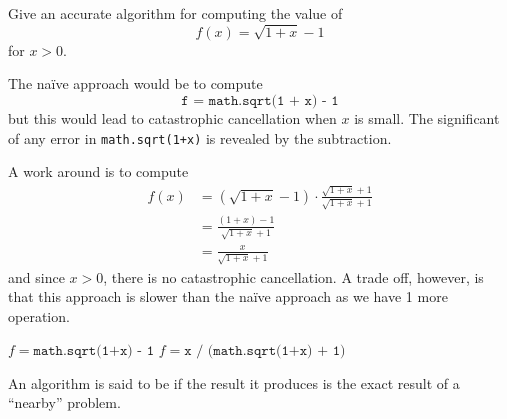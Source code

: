 \begin{example}
    Give an accurate algorithm for computing the value of \[
        f(x) = \sqrt{1 + x} - 1
    \] for \( x > 0 \).

    The na\"ive approach would be to compute \[
        \texttt{f = math.sqrt(1 + x) - 1}
    \] but this would lead to catastrophic cancellation when \( x \) is small. The significant of any error in \texttt{math.sqrt(1+x)} is revealed by the subtraction.

    A work around is to compute \begin{align*}
        f(x)
         & = (\sqrt{1+x} - 1) \cdot \frac{\sqrt{1+x}+1}{\sqrt{1+x}+1} \\
         & = \frac{(1+x) - 1}{\sqrt{1+x} + 1}                         \\
         & = \frac{x}{\sqrt{1+x} + 1}
    \end{align*} and since \( x > 0 \), there is no catastrophic cancellation. A trade off, however, is that this approach is slower than the na\"ive approach as we have 1 more operation.

    \begin{algorithm}[H]
    \begin{algorithmic}
        \State \( f = \texttt{math.sqrt(1+x) - 1} \)
        \Else
        \State \( f = \texttt{x / (math.sqrt(1+x) + 1)} \)
        \EndIf
        \EndFunction
    \end{algorithmic}
    \end{algorithm}
\end{example}

\begin{definition}
    An algorithm is said to be  if the result it produces is the exact result of a ``nearby'' problem.
\end{definition}

